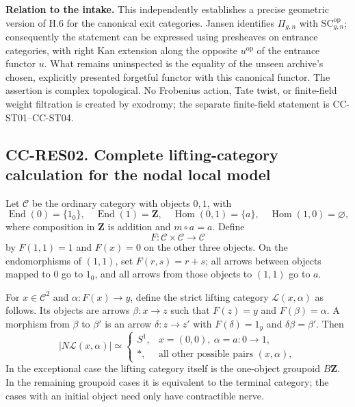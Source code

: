 \textbf{Relation to the intake.} This independently establishes a
precise geometric version of H.6 for the canonical exit categories.
Jansen identifies \(\Pi_{g,n}\) with
\(\mathrm{SC}_{g,n}^{\mathrm{op}}\); consequently the statement can be
expressed using presheaves on entrance categories, with right Kan
extension along the opposite \(u^{\mathrm{op}}\) of the entrance functor
\(u\). What remains uninspected is the equality of the unseen archive's
chosen, explicitly presented forgetful functor with this canonical
functor. The assertion is complex topological. No Frobenius action, Tate
twist, or finite-field weight filtration is created by exodromy; the
separate finite-field statement is CC-ST01--CC-ST04.

\subsection{CC-RES02. Complete lifting-category calculation for the
nodal local
model}\label{cc-res02.-complete-lifting-category-calculation-for-the-nodal-local-model}

Let \(\mathcal C\) be the ordinary category with objects \(0,1\), with
\[
\operatorname{End}(0)=\{1_0\},\quad
\operatorname{End}(1)=\mathbf Z,\quad
\operatorname{Hom}(0,1)=\{a\},\quad
\operatorname{Hom}(1,0)=\varnothing,
\] where composition in \(\mathbf Z\) is addition and \(m\circ a=a\).
Define \[
F:\mathcal C\times\mathcal C\longrightarrow\mathcal C
\] by \(F(1,1)=1\) and \(F(x)=0\) on the other three objects. On the
endomorphisms of \((1,1)\), set \(F(r,s)=r+s\); all arrows between
objects mapped to 0 go to \(1_0\), and all arrows from those objects to
\((1,1)\) go to \(a\).

For \(x\in\mathcal C^2\) and \(\alpha:F(x)\to y\), define the strict
lifting category \(\mathcal L(x,\alpha)\) as follows. Its objects are
arrows \(\beta:x\to z\) such that \(F(z)=y\) and \(F(\beta)=\alpha\). A
morphism from \(\beta\) to \(\beta'\) is an arrow \(\delta:z\to z'\)
with \(F(\delta)=1_y\) and \(\delta\beta=\beta'\). Then \[
|N\mathcal L(x,\alpha)|\simeq
\begin{cases}
S^1,&x=(0,0),\ \alpha=a:0\to1,\\
*,&\text{all other possible pairs }(x,\alpha),
\end{cases}
\tag{CC-RES.4}
\] In the exceptional case the lifting category itself is the one-object
groupoid \(B\mathbf Z\). In the remaining groupoid cases it is
equivalent to the terminal category; the cases with an initial object
need only have contractible nerve.

